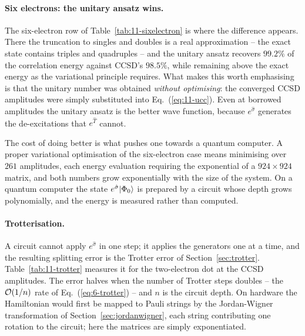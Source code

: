 \paragraph{Six electrons: the unitary ansatz wins.}
The six-electron row of Table~\ref{tab:11-sixelectron} is where the difference
appears.  There the truncation to singles and doubles is a real
approximation -- the exact state contains triples and quadruples -- and the
unitary ansatz recovers $99.2\%$ of the correlation energy against CCSD's
$98.5\%$, while remaining above the exact energy as the variational principle
requires.  What makes this worth emphasising is that the unitary number was
obtained \emph{without optimising}: the converged CCSD amplitudes were simply
substituted into Eq.~(\ref{eq:11-ucc}).  Even at borrowed amplitudes the
unitary ansatz is the better wave function, because $e^{\hat{\sigma}}$
generates the de-excitations that $e^{\hat{T}}$ cannot.

The cost of doing better is what pushes one towards a quantum computer.  A
proper variational optimisation of the six-electron case means minimising over
$261$ amplitudes, each energy evaluation requiring the exponential of a
$924\times924$ matrix, and both numbers grow exponentially with the size of
the system.  On a quantum computer the state $e^{\hat{\sigma}}\vert \Phi_0 \rangle$
is prepared by a circuit whose depth grows polynomially, and the energy is
measured rather than computed.

\paragraph{Trotterisation.}
A circuit cannot apply $e^{\hat{\sigma}}$ in one step; it applies the
generators one at a time, and the resulting splitting error is the Trotter
error of Section~\ref{sec:trotter}.  Table~\ref{tab:11-trotter} measures it
for the two-electron dot at the CCSD amplitudes.  The error halves when the
number of Trotter steps doubles -- the $\mathcal{O}(1/n)$ rate of
Eq.~(\ref{eq:6-trotter}) -- and $n$ is the circuit depth.  On hardware the
Hamiltonian would first be mapped to Pauli strings by the Jordan-Wigner
transformation of Section~\ref{sec:jordanwigner}, each string contributing one
rotation to the circuit; here the matrices are simply exponentiated.

